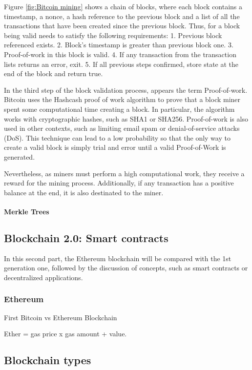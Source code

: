 Figure \ref{fig:Bitcoin mining} shows a chain of blocks, where each block contains a timestamp, a nonce, a hash reference to the previous block and a list of all the transactions that have been created since the previous block. Thus, for a block being valid needs to satisfy the following requirements: 1. Previous block referenced exists. 2. Block's timestamp is greater than previous block one. 3. Proof-of-work in this block is valid. 4. If any transaction from the transaction lists returns an error, exit. 5. If all previous steps confirmed, store state at the end of the block and return true.

In the third step of the block validation process, appears the term Proof-of-work. Bitcoin uses the Hashcash proof of work algorithm to prove that a block miner spent some computational time creating a block. In particular, the algorithm works with cryptographic hashes, such as SHA1 or SHA256. Proof-of-work is also used in other contexts, such as limiting email spam or denial-of-service attacks (DoS). This technique can lead to a low probability so that the only way to create a valid block is simply trial and error until a valid Proof-of-Work is generated.

Nevertheless, as miners must perform a high computational work, they receive a reward for the mining process. Additionally, if any transaction has a positive balance at the end, it is also destinated to the miner.

\paragraph{Merkle Trees}


\subsection{Blockchain 2.0: Smart contracts}

 In this second part, the Ethereum blockchain will be compared with the 1st generation one, followed by the discussion of concepts, such as smart contracts or decentralized applications.
 
\subsubsection{Ethereum}

First Bitcoin vs Ethereum Blockchain

Ether = gas price x gas amount + value.

\subsection{Blockchain types}


